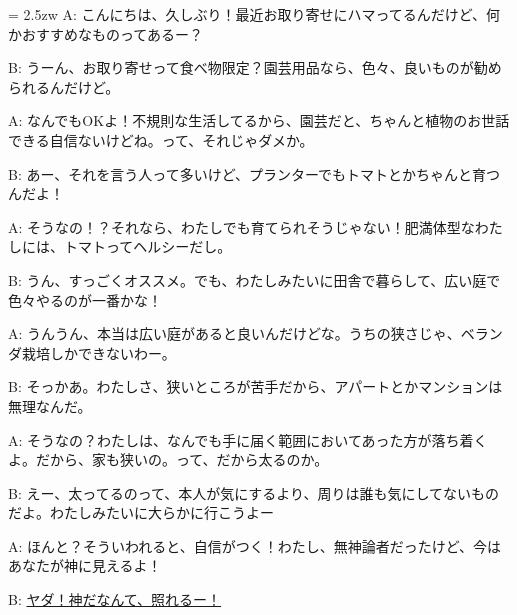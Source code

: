 \documentclass[11pt]{amsart}
\title{}
\author{}
\newenvironment{hangall}[1]{\hangindent = 2.5zw\everypar{\hangindent = 2.5zw}}{}
\begin{document}
\maketitle
\begin{hangall}{}%
A: こんにちは、久しぶり！最近お取り寄せにハマってるんだけど、何かおすすめなものってあるー？

B: うーん、お取り寄せって食べ物限定？園芸用品なら、色々、良いものが勧められるんだけど。

A: なんでもOKよ！不規則な生活してるから、園芸だと、ちゃんと植物のお世話できる自信ないけどね。って、それじゃダメか。

B: あー、それを言う人って多いけど、プランターでもトマトとかちゃんと育つんだよ！

A: そうなの！？それなら、わたしでも育てられそうじゃない！肥満体型なわたしには、トマトってヘルシーだし。

B: うん、すっごくオススメ。でも、わたしみたいに田舎で暮らして、広い庭で色々やるのが一番かな！

A: うんうん、本当は広い庭があると良いんだけどな。うちの狭さじゃ、ベランダ栽培しかできないわー。

B: そっかあ。わたしさ、狭いところが苦手だから、アパートとかマンションは無理なんだ。

A: そうなの？わたしは、なんでも手に届く範囲においてあった方が落ち着くよ。だから、家も狭いの。って、だから太るのか。

B: えー、太ってるのって、本人が気にするより、周りは誰も気にしてないものだよ。わたしみたいに大らかに行こうよー

A: ほんと？そういわれると、自信がつく！わたし、無神論者だったけど、今はあなたが神に見えるよ！

B: \ul{ヤダ！神だなんて、照れるー！}\end{hangall}
\end{document}
